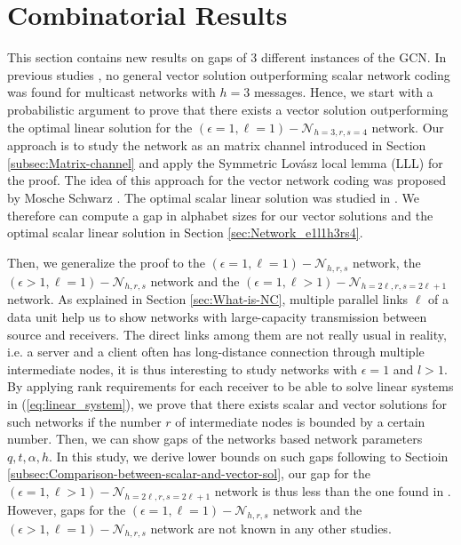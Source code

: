 \chapter{Combinatorial Results} \label{chap:comb_res}

This section contains new results on gaps of 3 different instances
of the GCN. In previous studies \cite{Wachter-Zeh:2018}, no general
vector solution outperforming scalar network coding was found for
multicast networks with $h=3$ messages. Hence, we start with a probabilistic
argument to prove that there exists a vector solution outperforming
the optimal linear solution for the $\left(\epsilon=1,\ell=1\right)-\mathcal{N}_{h=3,r,s=4}$
network. Our approach is to study the network as an matrix channel
introduced in Section \ref{subsec:Matrix-channel} and apply the Symmetric
Lov\'asz local lemma (LLL) for the proof. The idea of this approach
for the vector network coding was proposed by Mosche Schwarz \cite{MosheSchwartz:2018}.
The optimal scalar linear solution was studied in \cite{Wachter-Zeh:2018}.
We therefore can compute a gap in alphabet sizes for our vector solutions
and the optimal scalar linear solution in Section \ref{sec:Network_e1l1h3rs4}. 

Then, we generalize the proof to the $\left(\epsilon=1,\ell=1\right)-\mathcal{N}_{h,r,s}$
network, the $\left(\epsilon>1,\ell=1\right)-\mathcal{N}_{h,r,s}$
network and the $\left(\epsilon=1,\ell>1\right)-\mathcal{N}_{h=2\ell,r,s=2\ell+1}$
network. As explained in Section \ref{sec:What-is-NC}, multiple parallel
links $\ell$ of a data unit help us to show networks with large-capacity
transmission between source and receivers. The direct links among
them are not really usual in reality, i.e. a server and a client often
has long-distance connection through multiple intermediate nodes,
it is thus interesting to study networks with $\epsilon=1$ and $l>1$.
By applying rank requirements for each receiver to be able to solve
linear systems in (\ref{eq:linear_system}), we prove that there exists
scalar and vector solutions for such networks if the number $r$ of
intermediate nodes is bounded by a certain number. Then, we can show
gaps of the networks based network parameters $q,t,\alpha,h$. In
this study, we derive lower bounds on such gaps following to Sectioin
\ref{subsec:Comparison-between-scalar-and-vector-sol}, our gap for
the $\left(\epsilon=1,\ell>1\right)-\mathcal{N}_{h=2\ell,r,s=2\ell+1}$
network is thus less than the one found in \cite{Wachter-Zeh:2018}.
However, gaps for the $\left(\epsilon=1,\ell=1\right)-\mathcal{N}_{h,r,s}$
network and the $\left(\epsilon>1,\ell=1\right)-\mathcal{N}_{h,r,s}$
network are not known in any other studies.

